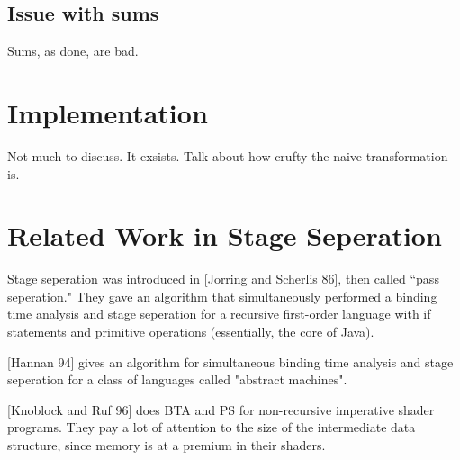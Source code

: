 \documentclass{article}
\begin{document}
\subsection{Issue with sums}

Sums, as done, are bad.

\section {Implementation}

Not much to discuss.  It exsists.  Talk about how crufty the naive transformation is.

\section{Related Work in Stage Seperation}
Stage seperation was introduced in [Jorring and Scherlis 86], then called ``pass seperation."  They gave an algorithm that simultaneously performed a binding time analysis and stage seperation for a recursive first-order language with if statements and primitive operations (essentially, the core of Java).

[Hannan 94] gives an algorithm for simultaneous binding time analysis and stage seperation for a class of languages called "abstract machines".

[Knoblock and Ruf 96] does BTA and PS for non-recursive imperative shader programs.  They pay a lot of attention to the size of the intermediate data structure, since memory is at a premium in their shaders.
\end{document}
